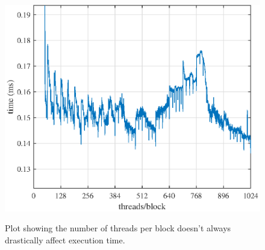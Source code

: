 \begin{figure}
	\centering\includegraphics[width=5in]{figures/gpu_intro/ConvGPU_global_12672_186taps.eps}
	\label{fig:ConvGPU_global_12672_186taps}
	\caption{Plot showing the number of threads per block doesn't always drastically affect execution time.}
\end{figure}
%

